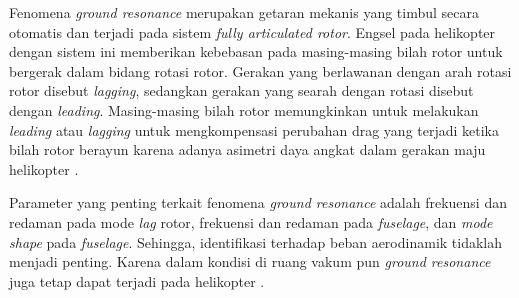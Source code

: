 Fenomena \textit{ground resonance} merupakan getaran mekanis yang timbul secara otomatis dan terjadi pada sistem \textit{fully articulated rotor}. Engsel pada helikopter dengan sistem ini memberikan kebebasan pada masing-masing bilah rotor untuk bergerak dalam bidang rotasi rotor. Gerakan yang berlawanan dengan arah rotasi rotor disebut \textit{lagging}, sedangkan gerakan yang searah dengan rotasi disebut dengan \textit{leading}. Masing-masing bilah rotor memungkinkan untuk melakukan \textit{leading} atau \textit{lagging} untuk mengkompensasi perubahan drag yang terjadi ketika bilah rotor berayun karena adanya asimetri daya angkat dalam gerakan maju helikopter \cite{Eckert2007AnalyticalAA}.

Parameter yang penting terkait fenomena \textit{ground resonance} adalah frekuensi dan redaman pada mode \textit{lag} rotor, frekuensi dan redaman pada \textit{fuselage}, dan \textit{mode shape} pada \textit{fuselage}. Sehingga, identifikasi terhadap beban aerodinamik tidaklah menjadi penting. Karena dalam kondisi di ruang vakum pun \textit{ground resonance} juga tetap dapat terjadi pada helikopter \cite{bramwell2001bramwell}.

